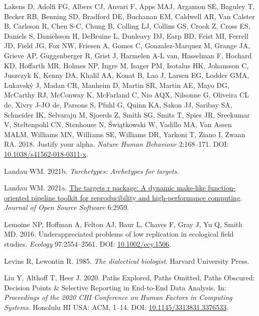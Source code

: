 \documentclass[10pt,a4paper]{article}
\newlength{\cslhangindent}
\newlength{\cslentryspacingunit} %
\newenvironment{CSLReferences}[2] %
 {%
  \setlength{\parindent}{0pt}
  \ifodd #1
  \let\oldpar\par
  \def\par{\hangindent=\cslhangindent\oldpar}
  \fi
  \setlength{\parskip}{#2\cslentryspacingunit}
 }%
 {}
\begin{document}
\begin{CSLReferences}{1}{0}
\leavevmode{}%
Lakens D, Adolfi FG, Albers CJ, Anvari F, Apps MAJ, Argamon SE, Baguley T, Becker RB, Benning SD, Bradford DE, Buchanan EM, Caldwell AR, Van Calster B, Carlsson R, Chen S-C, Chung B, Colling LJ, Collins GS, Crook Z, Cross ES, Daniels S, Danielsson H, DeBruine L, Dunleavy DJ, Earp BD, Feist MI, Ferrell JD, Field JG, Fox NW, Friesen A, Gomes C, Gonzalez-Marquez M, Grange JA, Grieve AP, Guggenberger R, Grist J, Harmelen A-L van, Hasselman F, Hochard KD, Hoffarth MR, Holmes NP, Ingre M, Isager PM, Isotalus HK, Johansson C, Juszczyk K, Kenny DA, Khalil AA, Konat B, Lao J, Larsen EG, Lodder GMA, Lukavský J, Madan CR, Manheim D, Martin SR, Martin AE, Mayo DG, McCarthy RJ, McConway K, McFarland C, Nio AQX, Nilsonne G, Oliveira CL de, Xivry J-JO de, Parsons S, Pfuhl G, Quinn KA, Sakon JJ, Saribay SA, Schneider IK, Selvaraju M, Sjoerds Z, Smith SG, Smits T, Spies JR, Sreekumar V, Steltenpohl CN, Stenhouse N, Świątkowski W, Vadillo MA, Van Assen MALM, Williams MN, Williams SE, Williams DR, Yarkoni T, Ziano I, Zwaan RA. 2018. Justify your alpha. \emph{Nature Human Behaviour} 2:168--171. DOI: \href{https://doi.org/10.1038/s41562-018-0311-x}{10.1038/s41562-018-0311-x}.

\leavevmode{}%
Landau WM. 2021b. \emph{Tarchetypes: Archetypes for targets}.

\leavevmode{}%
Landau WM. 2021a. \href{https://doi.org/10.21105/joss.02959}{The targets r package: A dynamic make-like function-oriented pipeline toolkit for reproducibility and high-performance computing}. \emph{Journal of Open Source Software} 6:2959.

\leavevmode{}%
Lemoine NP, Hoffman A, Felton AJ, Baur L, Chaves F, Gray J, Yu Q, Smith MD. 2016. Underappreciated problems of low replication in ecological field studies. \emph{Ecology} 97:2554--2561. DOI: \href{https://doi.org/10.1002/ecy.1506}{10.1002/ecy.1506}.

\leavevmode{}%
Levins R, Lewontin R. 1985. \emph{The dialectical biologist}. Harvard University Press.

\leavevmode{}%
Liu Y, Althoff T, Heer J. 2020. Paths {Explored}, {Paths} {Omitted}, {Paths} {Obscured}: {Decision} {Points} \& {Selective} {Reporting} in {End}-to-{End} {Data} {Analysis}. In: \emph{Proceedings of the 2020 {CHI} {Conference} on {Human} {Factors} in {Computing} {Systems}}. Honolulu HI USA: ACM, 1--14. DOI: \href{https://doi.org/10.1145/3313831.3376533}{10.1145/3313831.3376533}.


\end{CSLReferences}
\end{document}
